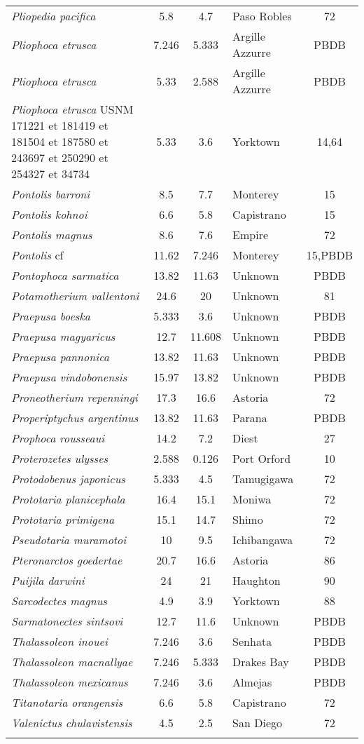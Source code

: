 \begin{longtable}{p{}cclc}
\textit{Pliopedia pacifica} & 	5.8	&	4.7	&	Paso Robles	&72\\
\textit{Pliophoca etrusca} & 	7.246	&	5.333	&	Argille Azzurre	&PBDB\\
\textit{Pliophoca etrusca} & 	5.33	&	2.588	&	Argille Azzurre	&PBDB\\
\textit{Pliophoca etrusca} USNM 171221 et 181419 et 181504 et 187580 et 243697 et 250290 et 254327 et 34734 & 	5.33	&	3.6	&	Yorktown	&14,64\\
\textit{Pontolis barroni} & 	8.5	&	7.7	&	Monterey	&15\\
\textit{Pontolis kohnoi} & 	6.6	&	5.8	&	Capistrano	&15\\
\textit{Pontolis magnus} & 	8.6	&	7.6	&	Empire	&72\\
\textit{Pontolis} cf & 	11.62	&	7.246	&	Monterey	&15,PBDB\\
\textit{Pontophoca sarmatica} & 	13.82	&	11.63	&	Unknown	&PBDB\\
\textit{Potamotherium vallentoni} & 	24.6	&	20	&	Unknown	&81\\
\textit{Praepusa boeska} & 	5.333	&	3.6	&	Unknown	&PBDB\\
\textit{Praepusa magyaricus} & 	12.7	&	11.608	&	Unknown	&PBDB\\
\textit{Praepusa pannonica} & 	13.82	&	11.63	&	Unknown	&PBDB\\
\textit{Praepusa vindobonensis} & 	15.97	&	13.82	&	Unknown	&PBDB\\
\textit{Proneotherium repenningi} & 	17.3	&	16.6	&	Astoria	&72\\
\textit{Properiptychus argentinus} & 	13.82	&	11.63	&	Parana	&PBDB\\
\textit{Prophoca rousseaui} & 	14.2	&	7.2	&	Diest	&27\\
\textit{Proterozetes ulysses} & 	2.588	&	0.126	&	Port Orford	&10\\
\textit{Protodobenus japonicus} & 	5.333	&	4.5	&	Tamugigawa	&72\\
\textit{Prototaria planicephala} & 	16.4	&	15.1	&	Moniwa	&72\\
\textit{Prototaria primigena} & 	15.1	&	14.7	&	Shimo	&72\\
\textit{Pseudotaria muramotoi} & 	10	&	9.5	&	Ichibangawa	&72\\
\textit{Pteronarctos goedertae} & 	20.7	&	16.6	&	Astoria	&86\\
\textit{Puijila darwini} & 	24	&	21	&	Haughton	&90\\
\textit{Sarcodectes magnus} & 	4.9	&	3.9	&	Yorktown	&88\\
\textit{Sarmatonectes sintsovi} & 	12.7	&	11.6	&	Unknown	&PBDB\\
\textit{Thalassoleon inouei} & 	7.246	&	3.6	&	Senhata	&PBDB\\
\textit{Thalassoleon macnallyae} & 	7.246	&	5.333	&	Drakes Bay	&PBDB\\
\textit{Thalassoleon mexicanus} & 	7.246	&	3.6	&	Almejas	&PBDB\\
\textit{Titanotaria orangensis} & 	6.6	&	5.8	&	Capistrano	&72\\
\textit{Valenictus chulavistensis} & 	4.5	&	2.5	&	San Diego	&72\\
\hline
\label{table-stratigraphy}
\end{longtable}

